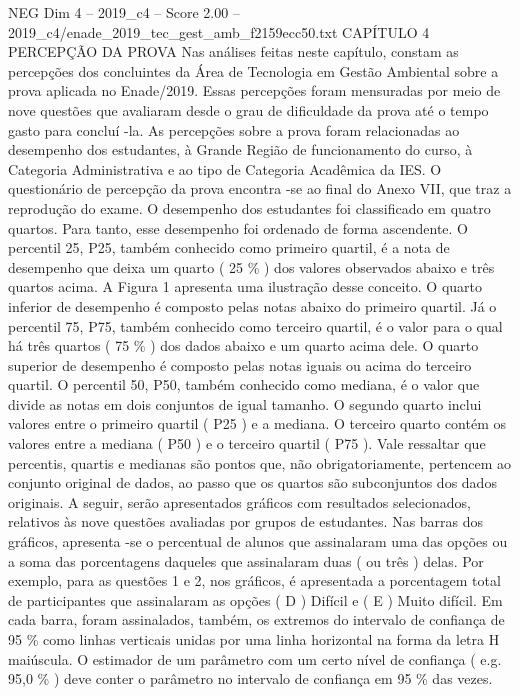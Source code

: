 \begin{textsample}{NEG Dim 4 – 2019\_c4 – Score 2.00 – 2019\_c4/enade\_2019\_tec\_gest\_amb\_f2159ecc50.txt}  \label{ex:f4_neg_247}
CAPÍTULO 4 PERCEPÇÃO DA PROVA Nas análises feitas neste capítulo, constam as percepções dos concluintes da Área de Tecnologia em Gestão Ambiental sobre a prova aplicada no Enade/2019.
Essas percepções foram mensuradas por meio de nove questões que avaliaram desde o grau de dificuldade da prova até o tempo gasto para concluí -la.
As percepções sobre a prova foram relacionadas ao desempenho dos estudantes, à Grande Região de funcionamento do curso, à Categoria Administrativa e ao tipo de Categoria Acadêmica da IES.
O questionário de percepção da prova encontra -se ao final do Anexo VII, que traz a reprodução do exame.
O desempenho dos estudantes foi classificado em quatro quartos.
Para tanto, esse desempenho foi ordenado de forma ascendente.
O percentil 25, P25, também conhecido como primeiro quartil, é a nota de desempenho que deixa um quarto ( 25 \% ) dos valores observados abaixo e três quartos acima.
A Figura 1 apresenta uma ilustração desse conceito.
O quarto inferior de desempenho é composto pelas notas abaixo do primeiro quartil.
Já o percentil 75, P75, também conhecido como terceiro quartil, é o valor para o qual há três quartos ( 75 \% ) dos dados abaixo e um quarto acima dele.
O quarto superior de desempenho é composto pelas notas iguais ou acima do terceiro quartil.
O percentil 50, P50, também conhecido como mediana, é o valor que divide as notas em dois conjuntos de igual tamanho.
O segundo quarto inclui valores entre o primeiro quartil ( P25 ) e a mediana.
O terceiro quarto contém os valores entre a mediana ( P50 ) e o terceiro quartil ( P75 ).
Vale ressaltar que percentis, quartis e medianas são pontos que, não obrigatoriamente, pertencem ao conjunto original de dados, ao passo que os quartos são subconjuntos dos dados originais.
A seguir, serão apresentados gráficos com resultados selecionados, relativos às nove questões avaliadas por grupos de estudantes.
Nas barras dos gráficos, apresenta -se o percentual de alunos que assinalaram uma das opções ou a soma das porcentagens daqueles que assinalaram duas ( ou três ) delas.
Por exemplo, para as questões 1 e 2, nos gráficos, é apresentada a porcentagem total de participantes que assinalaram as opções ( D ) Difícil e ( E ) Muito difícil.
Em cada barra, foram assinalados, também, os extremos do intervalo de confiança de 95 \% como linhas verticais unidas por uma linha horizontal na forma da letra H maiúscula.
O estimador de um parâmetro com um certo nível de confiança ( e.g. 95,0 \% ) deve conter o parâmetro no intervalo de confiança em 95 \% das vezes.

\end{textsample}
